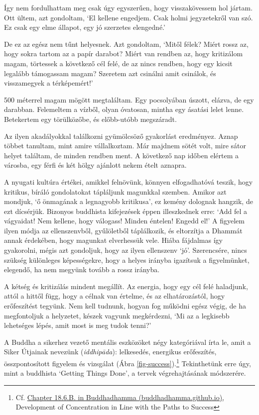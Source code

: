 Így nem fordulhattam meg csak úgy egyszerűen, hogy visszakövessem hol
jártam. Ott ültem, azt gondoltam, `El kellene engedjem. Csak holmi
jegyzetekről van szó. Ez csak egy elme állapot, egy jó szerzetes
elengedné.'

De ez az egész nem tűnt helyesnek. Azt gondoltam, `Mitől félek? Miért
rossz az, hogy sokra tartom az a papír darabot? Miért van rendben az,
hogy kritizálom magam, törtessek a következő cél felé, de az nincs
rendben, hogy egy kicsit legalább támogassam magam? Szeretem azt
csinálni amit csinálok, és visszamegyek a térképemért!'

500 méterrel magam mögött megtaláltam. Egy pocsolyában úszott, elázva,
de egy darabban. Felemeltem a vízből, olyan óvatosan, mintha egy ásatási
lelet lenne. Betekertem egy törülközőbe, és előbb-utóbb megszáradt.

Az ilyen akadályokkal találkozni gyümölcsöző gyakorlást eredményez.
Aznap többet tanultam, mint amire vállalkoztam. Már majdnem sötét volt,
mire sátor helyet találtam, de minden rendben ment. A következő nap
időben elértem a városba, egy férfi és két hölgy ajánlott nekem ételt
aznapra.

A nyugati kultúra értékei, amikkel felnövünk, könnyen elfogadhatóvá
teszik, hogy kritikus, bíráló gondolatokat tápláljunk magunkkal szemben.
Amikor azt mondjuk, `ő önmagának a legnagyobb kritikusa', ez kemény
dolognak hangzik, de ezt dícsérjük. Bizonyos buddhista kifejezések éppen
illeszkednek erre: `Add fel a vágyaidat! Nem kellene, hogy válogass!
Minden éntelen! Engedd el!' A figyelem ilyen módja az ellenszenvből,
gyűlöletből táplálkozik, és eltorzítja a Dhammát annak érdekében, hogy
magunkat elverhessük vele. Hiába fájdalmas így gyakorolni, mégis azt
gondoljuk, hogy az ilyen ellenszenv `jó'. Szerencsére, nincs szükség
különleges képességekre, hogy a helyes irányba igazítsuk a figyelmünket,
elegendő, ha nem megyünk tovább a rossz irányba.


A kétség és kritizálás mindent megállít. Az energia, hogy egy cél felé
haladjunk, attól a hittől függ, hogy a célnak van értelme, és az
elhatározástól, hogy erőfeszítést tegyünk. Nem kell tudnunk, hogyan fog
működni egész végig, de ha megfontoljuk a helyzetet, készek vagyunk
megkérdezni, `Mi az a legkisebb lehetséges lépés, amit most is meg tudok
tenni?'

A Buddha a sikerhez vezető mentális eszközöket négy kategóriával írta
le, amit a Siker Útjainak nevezünk (\emph{iddhipāda}): lelkesedés,
energikus erőfeszítés, összpontosított figyelem és vizsgálat (Ábra
\ref{fig-success}).\footnote{Cf.
  \href{https://buddhadhamma.github.io/path-factors-of-concentration.html\#development-of-concentration-in-line-with-the-paths-to-success}{Chapter
  18.6.B. in Buddhadhamma (buddhadhamma.github.io)}, Development of
  Concentration in Line with the Paths to Success} Tekinthetünk erre
úgy, mint a buddhista `Getting Things Done', a tervek végrehajtásának
módszerére.

